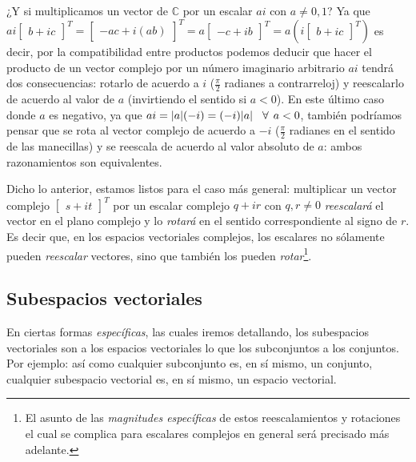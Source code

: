 \documentclass[12pt]{article}
\begin{document}
   ¿Y si multiplicamos un vector de $\mathbb{C}$ por un escalar $ai$ con $a\neq 0,1$? Ya que $ai\begin{bmatrix}b + ic\end{bmatrix}^T=\begin{bmatrix}-ac+i(ab)\end{bmatrix}^T=a\begin{bmatrix}-c+ib\end{bmatrix}^T=a(i\begin{bmatrix}b+ic\end{bmatrix}^T)$ \textemdash es decir, por la compatibilidad entre productos\textemdash\hspace{0.5mm} podemos deducir que hacer el producto de un vector complejo por un número imaginario arbitrario $ai$ tendrá dos consecuencias: rotarlo de acuerdo a $i$ ($\frac{\pi}{2}$ radianes a contrarreloj) y reescalarlo de acuerdo al valor de $a$ (invirtiendo el sentido si $a<0$). En este último caso donde $a$ es negativo, ya que $ai=|a|(-i)=(-i)|a| \hspace{3mm}\forall\hspace{1.5mm} a<0$, también podríamos pensar que se rota al vector complejo de acuerdo a $-i$ ($\frac{\pi}{2}$ radianes en el sentido de las manecillas) y se reescala de acuerdo al valor absoluto de $a$: ambos razonamientos son equivalentes.

Dicho lo anterior, estamos listos para el caso más general: multiplicar un vector complejo $\begin{bmatrix}s+it\end{bmatrix}^T$ por un escalar complejo $q+ir$ con $q,r\neq0$ \emph{reescalará} el vector en el plano complejo y lo \emph{rotará} en el sentido correspondiente al signo de $r$. Es decir que, en los espacios vectoriales complejos, los escalares no sólamente pueden \emph{reescalar} vectores, sino que también los pueden \emph{rotar}\footnote{El asunto de las \emph{magnitudes específicas} de estos reescalamientos y rotaciones \textemdash el cual se complica para escalares complejos en general\textemdash\hspace{0.5mm} será precisado más adelante.}.

\subsection{Subespacios vectoriales}

En ciertas formas \emph{específicas}, las cuales iremos detallando, los subespacios vectoriales son a los espacios vectoriales lo que los subconjuntos a los conjuntos. Por ejemplo: así como cualquier subconjunto es, en sí mismo, un conjunto, cualquier subespacio vectorial es, en sí mismo, un espacio vectorial.
\end{document}
